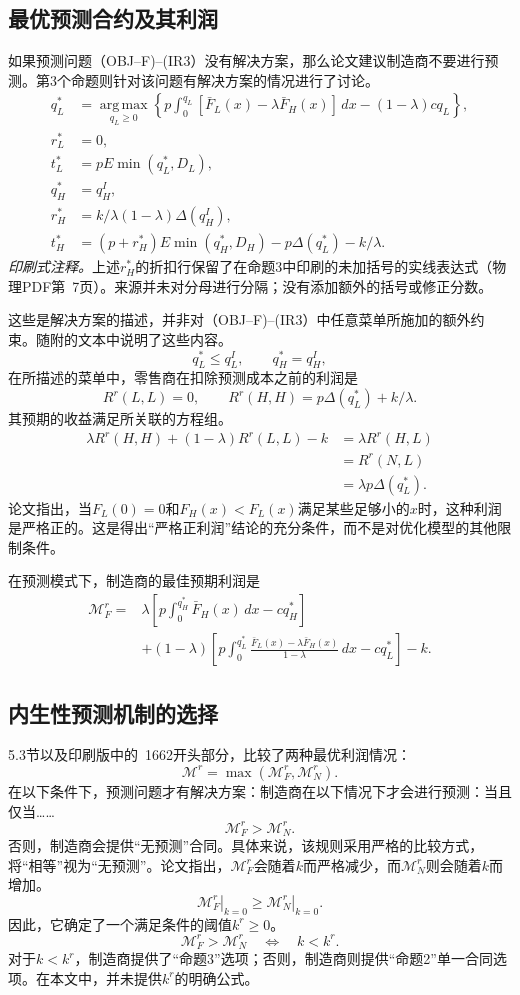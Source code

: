 \documentclass{article}
\begin{document}
\subsection*{最优预测合约及其利润}
如果预测问题（OBJ--F)--(IR3）没有解决方案，那么论文建议制造商不要进行预测。第3个命题则针对该问题有解决方案的情况进行了讨论。
\begin{align*}
q_L^*&=\operatorname*{arg\,max}_{q_L\geq0}
 \left\{p\int_0^{q_L}[\bar F_L(x)-\lambda\bar F_H(x)]\,dx
 -(1-\lambda)cq_L\right\},\\
r_L^*&=0,\\
t_L^*&=pE\min(q_L^*,D_L),\\
q_H^*&=q_H^I,\\
r_H^*&=k/\lambda(1-\lambda)\Delta(q_H^I),\\
t_H^*&=(p+r_H^*)E\min(q_H^*,D_H)
 -p\Delta(q_L^*)-k/\lambda.
\end{align*}
\noindent\emph{印刷式注释。}上述$r_H^*$的折扣行保留了在命题3中印刷的未加括号的实线表达式（物理PDF第~7页）。来源并未对分母进行分隔；没有添加额外的括号或修正分数。

这些是解决方案的描述，并非对（OBJ--F)--(IR3）中任意菜单所施加的额外约束。随附的文本中说明了这些内容。
\[
q_L^*\leq q_L^I,\qquad q_H^*=q_H^I,
\]
在所描述的菜单中，零售商在扣除预测成本之前的利润是
\[
R^r(L,L)=0,\qquad R^r(H,H)=p\Delta(q_L^*)+k/\lambda.
\]
其预期的收益满足所关联的方程组。
\begin{align}
\lambda R^r(H,H)+(1-\lambda)R^r(L,L)-k
 &=\lambda R^r(H,L)\tag{2}\\
 &=R^r(N,L)\tag{3}\\
 &=\lambda p\Delta(q_L^*).\tag{4}
\end{align}
论文指出，当$F_L(0)=0$和$F_H(x)<F_L(x)$满足某些足够小的$x$时，这种利润是严格正的。这是得出“严格正利润”结论的充分条件，而不是对优化模型的其他限制条件。

在预测模式下，制造商的最佳预期利润是
\begin{equation}
\begin{split}
\mathcal M_F^r={}&\lambda\left[
 p\int_0^{q_H^*}\bar F_H(x)\,dx-cq_H^*\right]\\
&+(1-\lambda)\left[
 p\int_0^{q_L^*}\frac{\bar F_L(x)-\lambda\bar F_H(x)}{1-\lambda}\,dx
 -cq_L^*\right]-k.
\end{split}
\tag{5}
\end{equation}

\subsection*{内生性预测机制的选择}
5.3节以及印刷版中的~1662开头部分，比较了两种最优利润情况：
\[
\mathcal M^r=\max(\mathcal M_F^r,\mathcal M_N^r).
\]
在以下条件下，预测问题才有解决方案：制造商在以下情况下才会进行预测：当且仅当……
\[
\mathcal M_F^r>\mathcal M_N^r.
\]
否则，制造商会提供“无预测”合同。具体来说，该规则采用严格的比较方式，将“相等”视为“无预测”。论文指出，$\mathcal M_F^r$会随着$k$而严格减少，而$\mathcal M_N^r$则会随着$k$而增加。
\[
\left.\mathcal M_F^r\right|_{k=0}
 \geq \left.\mathcal M_N^r\right|_{k=0}.
\]
因此，它确定了一个满足条件的阈值$k^r\geq0$。
\[
\mathcal M_F^r>\mathcal M_N^r
\quad\Longleftrightarrow\quad k<k^r.
\]
对于$k<k^r$，制造商提供了“命题3”选项；否则，制造商则提供“命题2”单一合同选项。在本文中，并未提供$k^r$的明确公式。
\end{document}
